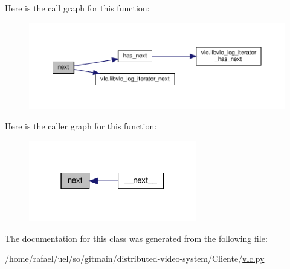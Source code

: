Here is the call graph for this function\+:
\nopagebreak
\begin{figure}[H]
\begin{center}
\leavevmode
\includegraphics[width=350pt]{classvlc_1_1_log_iterator_a9dbee9488c9365114fed347d1a8846f1_cgraph}
\end{center}
\end{figure}
Here is the caller graph for this function\+:
\nopagebreak
\begin{figure}[H]
\begin{center}
\leavevmode
\includegraphics[width=207pt]{classvlc_1_1_log_iterator_a9dbee9488c9365114fed347d1a8846f1_icgraph}
\end{center}
\end{figure}


The documentation for this class was generated from the following file\+:\begin{DoxyCompactItemize}
\item 
/home/rafael/uel/so/gitmain/distributed-\/video-\/system/\+Cliente/\hyperlink{vlc_8py}{vlc.\+py}\end{DoxyCompactItemize}
